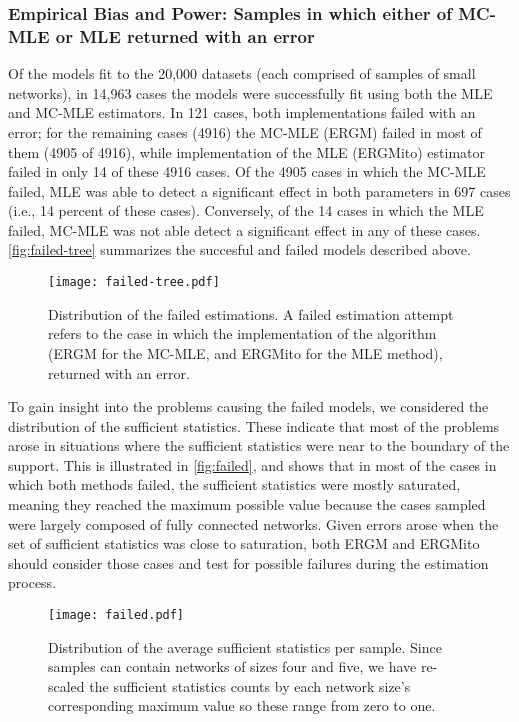 \documentclass[review]{elsarticle}
\begin{document}
\subsubsection{Empirical Bias and Power: Samples in which either of MC-MLE or MLE returned with an error}

Of the models fit to the 20,000 datasets (each comprised of samples of small networks), in 14,963 cases the models were successfully fit using both the MLE and MC-MLE estimators. In 121 cases, both implementations failed with an error; for the remaining cases (4916) the MC-MLE (ERGM) failed in most of them (4905 of 4916), while implementation of the MLE (ERGMito) estimator failed in only 14 of these 4916 cases. Of the 4905 cases in which the MC-MLE failed, MLE was able to detect a significant effect in both parameters in 697 cases (i.e., 14 percent of these cases). Conversely, of the 14 cases in which the MLE failed, MC-MLE was not able detect a significant effect in any of these cases. \autoref{fig:failed-tree} summarizes the succesful and failed models described above.

\begin{figure}
	\centering
	\caption{\label{fig:failed-tree}Distribution of the failed estimations. A failed estimation attempt refers to the case in which the implementation of the algorithm (ERGM for the MC-MLE, and ERGMito for the MLE method), returned with an error.}
	\texttt{[image: failed-tree.pdf]}
\end{figure}

To gain insight into the problems causing the failed models, we considered the distribution of the sufficient statistics. These indicate that most of the problems arose in situations where the sufficient statistics were near to the boundary of the support. This is illustrated in \autoref{fig:failed}, and shows that in most of the cases in which both methods failed, the sufficient statistics were mostly saturated, meaning they reached the maximum possible value because the  cases sampled were largely composed of fully connected networks. Given errors arose when the set of sufficient statistics was close to saturation, both ERGM and ERGMito should consider those cases and test for possible failures during the estimation process.

\begin{figure}
	\centering
	\caption{\label{fig:failed}Distribution of the average sufficient statistics per sample. Since samples can contain networks of sizes four and five, we have re-scaled the sufficient statistics counts by each network size's corresponding maximum value so these range from zero to one.}
	\texttt{[image: failed.pdf]}
\end{figure}
\end{document}
